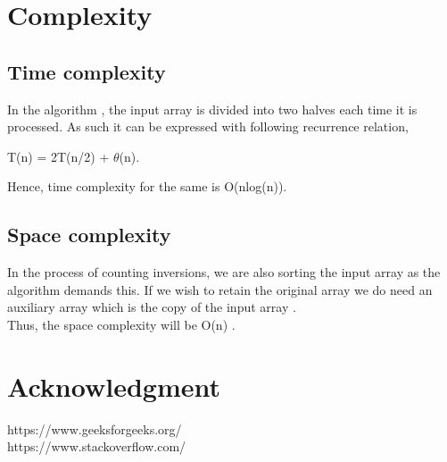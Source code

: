 \documentclass[conference]{IEEEtran}
\begin{document}
\section{Complexity}
\subsection{Time complexity}
In the algorithm , the input array is divided into two halves each time it is processed.
As such it can be expressed with following recurrence relation,
\begin{center} T(n) = 2T(n/2) + $\theta$(n).\end{center}
Hence, time complexity for the same is O(nlog(n)).

\subsection{Space complexity}
In the process of counting inversions, we are also sorting the input array as the algorithm demands this. If we wish to retain the original array we do need an auxiliary array which is the copy of the input array .\\ Thus, the space complexity will be O(n) .

\section*{Acknowledgment}


\begin{thebibliography}{00}
 https://www.geeksforgeeks.org/\\
  https://www.stackoverflow.com/
\end{thebibliography}
\vspace{12pt}
\end{document}
